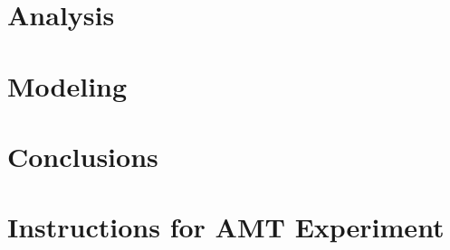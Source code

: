 \documentclass[11pt,a4paper]{article}
\begin{document}
\section{Analysis}
\label{sec:analysis}


\section{Modeling}
\label{sec:modeling}

\section{Conclusions}
\label{sec:conc}




\appendix
\section{Instructions for AMT Experiment}
\label{app:instructions}

\end{document}
